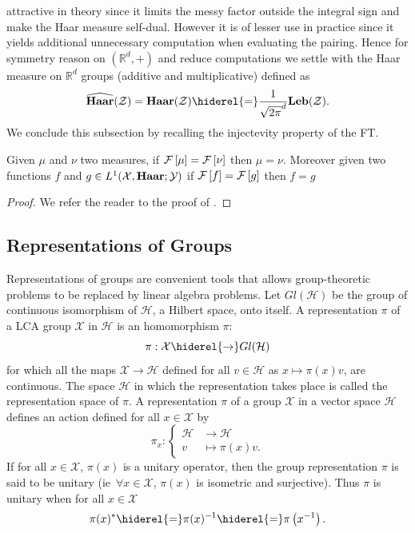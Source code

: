 attractive in theory since it limits the messy factor outside the integral sign
and make the Haar measure self-dual. However it is of lesser use in practice
since it yields additional unnecessary computation when evaluating the pairing.
Hence for symmetry reason on $(\mathbb{R}^d, +)$ and reduce computations we
settle with the Haar measure on $\mathbb{R}^d$ groups (additive and
multiplicative) defined as
\begin{dmath*}
    \dual{\Haar}(\mathcal{Z})
    = \Haar(\mathcal{Z})
    \hiderel{=} \frac{1}{\sqrt{2\pi}^d} \Leb(\mathcal{Z}).
\end{dmath*}
We conclude this subsection by recalling the injectevity property of the
\acl{FT}.
\begin{corollary}
    Given $\mu$ and $\nu$ two measures, if $\mathcal{F}\left[\mu\right]=\mathcal{F}\left[\nu\right]$ then $\mu=\nu$.
    Moreover given two functions $f$ and $g\in
    L^1(\mathcal{X},\mathbf{Haar};\mathcal{Y})$ if $\mathcal{F}\left[f\right]=\mathcal{F}\left[g\right]$ then $f=g$
\end{corollary}
\begin{proof}
    We refer the reader to the proof of \citet[corollary~4.34
    page~112]{folland1994course}.
\end{proof}

\subsection{Representations of Groups}
Representations of groups are convenient tools that allows
group\--\-theo\-re\-tic problems to be replaced by linear algebra problems. Let
$Gl(\mathcal{H})$ be the group of continuous isomorphism of $\mathcal{H}$, a
Hilbert space, onto itself. A representation $\pi$ of a \ac{LCA} group
$\mathcal{X}$ in $\mathcal{H}$ is an homomorphism $\pi$:
\begin{dmath*}
    \pi:\mathcal{X}\hiderel{\to} Gl(\mathcal{H})
\end{dmath*}
for which all the maps $\mathcal{X}\to\mathcal{H}$ defined for all
$v\in\mathcal{H}$ as $x\mapsto \pi(x)v$, are continuous. The space
$\mathcal{H}$ in which the representation takes place is called the
representation space of $\pi$. A representation $\pi$ of a group $\mathcal{X}$
in a vector space $\mathcal{H}$ defines an action defined for all
$x\in\mathcal{X}$ by
\begin{dmath*}
    \pi_x:
    \begin{cases}
        \mathcal{H}&\to\mathcal{H} \\
        v &\mapsto \pi(x)v.
    \end{cases}
\end{dmath*}
If for all $x\in\mathcal{X}$, $\pi(x)$ is a unitary operator, then the group
representation $\pi$ is said to be unitary (\acs{ie}~$\forall x\in\mathcal{X}$,
$\pi(x)$ is isometric and surjective). Thus $\pi$ is unitary when for all
$x\in\mathcal{X}$
\begin{dmath*}
    \pi(x)^*\hiderel{=}\pi(x)^{-1}\hiderel{=}\pi\left(x^{-1}\right).
\end{dmath*}
